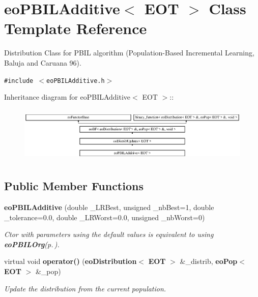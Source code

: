 \section{eo\-PBILAdditive$<$ EOT $>$ Class Template Reference}
\label{classeo_p_b_i_l_additive}
Distribution Class for PBIL algorithm (Population-Based Incremental Learning, Baluja and Caruana 96).  


{\tt \#include $<$eo\-PBILAdditive.h$>$}

Inheritance diagram for eo\-PBILAdditive$<$ EOT $>$::\begin{figure}[H]
\begin{center}
\leavevmode
\includegraphics[height=2.71186cm]{classeo_p_b_i_l_additive}
\end{center}
\end{figure}
\subsection*{Public Member Functions}
\begin{CompactItemize}
\item 
{\bf eo\-PBILAdditive} (double \_\-LRBest, unsigned \_\-nb\-Best=1, double \_\-tolerance=0.0, double \_\-LRWorst=0.0, unsigned \_\-nb\-Worst=0)\label{classeo_p_b_i_l_additive_a0}

\begin{CompactList}\small\item\em Ctor with parameters using the default values is equivalent to using {\bf eo\-PBILOrg}{\rm (p.\,\pageref{classeo_p_b_i_l_org})}. \item\end{CompactList}\item 
virtual void {\bf operator()} ({\bf eo\-Distribution}$<$ {\bf EOT} $>$ \&\_\-distrib, {\bf eo\-Pop}$<$ {\bf EOT} $>$ \&\_\-pop)\label{classeo_p_b_i_l_additive_a1}

\begin{CompactList}\small\item\em Update the distribution from the current population. \item\end{CompactList}\end{CompactItemize}
